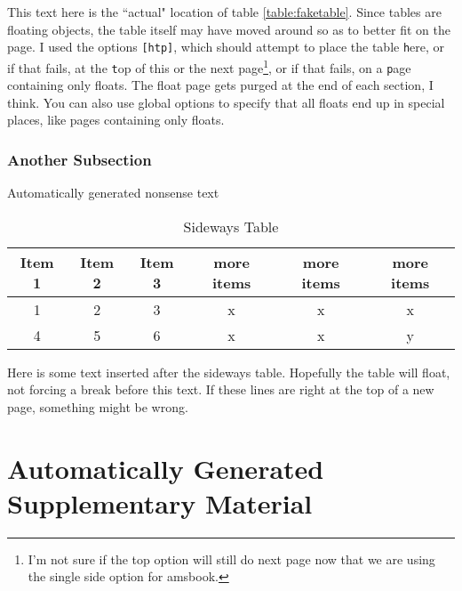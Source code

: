 \documentclass[reqno]{csuthesis}
\begin{document}
This text here is the ``actual" location of table \ref{table:faketable}.  Since tables are floating objects, the table itself may have moved around so as to better fit on the page.  I used the options \verb-[htp]-, which should attempt to place the table \verb-h-ere, or if that fails, at the \verb-t-op of this or the next page\footnote{I'm not sure if the top option will still do next page now that we are using the single side option for amsbook.}, or if that fails, on a \verb-p-age containing only floats.  The float page gets purged at the end of each section, I think.  You can also use global options to specify that all floats end up in special places, like pages containing only floats.

\subsection{Another Subsection}

Automatically generated nonsense text

\begin{sidewayspage}
\begin{table}[h]
\caption{Sideways Table \label{table:sidetable}}
\begin{tabular}{|c|c|c|ccc|}
\hline
Item 1 & Item 2 & Item 3 & more items & more items & more items\\
\hline
\hline
1 & 2 & 3 & x & x & x\\
4 & 5 & 6 & x & x & y\\
\hline
\end{tabular}
\end{table}
\end{sidewayspage}

Here is some text inserted after the sideways table.  Hopefully the table will float, not forcing a break before this text.  If these lines are right at the top of a new page, something might be wrong.

\backmatter

\appendix

% 
\chapter{Automatically Generated Supplementary Material} %
\end{document}

